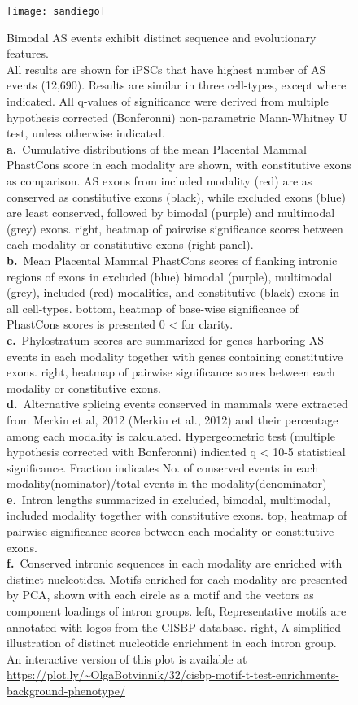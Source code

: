 \begin{figure}[h] 
  \centering
  \texttt{[image: sandiego]}
  \caption[Bimodal AS events exhibit distinct sequence and evolutionary features.]{
  Bimodal AS events exhibit distinct sequence and evolutionary features.\\
All results are shown for iPSCs that have highest number of AS events (12,690). Results are similar in three cell-types, except where indicated. All q-values of significance were derived from multiple hypothesis corrected (Bonferonni) non-parametric Mann-Whitney U test, unless otherwise indicated.\\
\textbf{a.}~Cumulative distributions of the mean Placental Mammal PhastCons score in each modality are shown, with constitutive exons as comparison. AS exons from included modality (red) are as conserved as constitutive exons (black), while excluded exons (blue) are least conserved, followed by bimodal (purple) and multimodal (grey) exons. right, heatmap of pairwise significance scores between each modality or constitutive exons (right panel).\\
\textbf{b.}~Mean Placental Mammal PhastCons scores of flanking intronic regions of exons in excluded (blue) bimodal (purple), multimodal (grey), included (red) modalities, and constitutive (black) exons in all cell-types. bottom, heatmap of base-wise significance of PhastCons scores is presented 0 <  for clarity.\\
\textbf{c.}~Phylostratum scores are summarized for genes harboring AS events in each modality together with genes containing constitutive exons. right, heatmap of pairwise significance scores between each modality or constitutive exons.\\
\textbf{d.}~Alternative splicing events conserved in mammals were extracted from Merkin et al, 2012 (Merkin et al., 2012) and their percentage among each modality is calculated. Hypergeometric test (multiple hypothesis corrected with Bonferonni) indicated q < 10-5 statistical significance. Fraction indicates No. of conserved events in each modality(nominator)/total events in the modality(denominator)\\
\textbf{e.}~Intron lengths summarized in excluded, bimodal, multimodal, included modality together with constitutive exons. top, heatmap of pairwise significance scores between each modality or constitutive exons.\\
\textbf{f.}~Conserved intronic sequences in each modality are enriched with distinct nucleotides. Motifs enriched for each modality are presented by PCA, shown with each circle as a motif and the vectors as component loadings of intron groups. left, Representative motifs are annotated with logos from the CISBP database. right, A simplified illustration of distinct nucleotide enrichment in each intron group. An interactive version of this plot is available at \url{https://plot.ly/~OlgaBotvinnik/32/cisbp-motif-t-test-enrichments-background-phenotype/}
}
  \label{fig:modality_features}
\end{figure}


